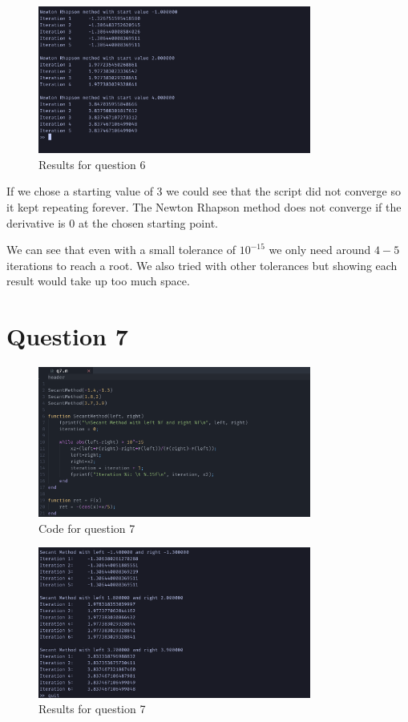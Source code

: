 \documentclass{article}
\begin{document}
\begin{figure}[H]
	\centering
	\includegraphics[width=0.8\textwidth]{imgs/q6_results.png}
	\caption{Results for question 6}
	\label{fig:q6_result}
\end{figure}

If we chose a starting value of 3 we could see that the script did not converge so it kept repeating forever. The Newton Rhapson method does not converge if the derivative is $0$ at the chosen starting point.

We can see that even with a small tolerance of $10^{-15}$ we only need around $4-5$ iterations to reach a root. We also tried with other tolerances but showing each result would take up too much space.

\newpage
\section{Question 7}
\begin{figure}[H]
	\centering
	\includegraphics[width=0.8\textwidth]{imgs/q7_code.png}
	\caption{Code for question 7}
	\label{fig:q7_code}
\end{figure}

\begin{figure}[H]
	\centering
	\includegraphics[width=0.8\textwidth]{imgs/q7_results.png}
	\caption{Results for question 7}
	\label{fig:q7_result}
\end{figure}
\end{document}
